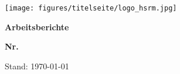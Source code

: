 \begin{titlepage}
    \begin{flushright}
        \texttt{[image: figures/titelseite/logo\_hsrm.jpg]}
    \end{flushright}
    \vspace*{50mm}
    
    \begin{center}
        {\LARGE \bfseries \ttitle\par\vspace{4mm}} %
        {\large \bfseries \tsubtitle\par\vspace{30mm}} %
    \end{center}
    \vfill
    \begin{minipage}{\textwidth}
        {\large \bfseries Arbeitsberichte \groupname \par}
        {\large \bfseries Nr. \workingpapernumbername \par\vspace{4mm}}
        \authorname %
        \par\vspace{2mm}
        Stand: \today
    \end{minipage}

 

\end{titlepage}